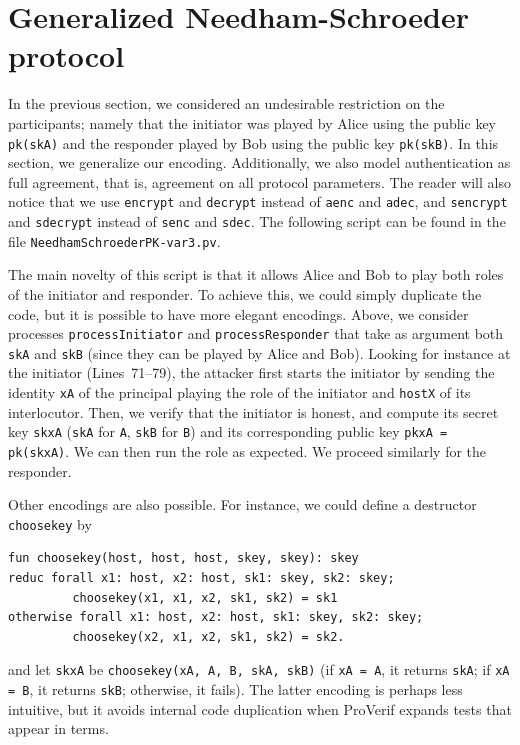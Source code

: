 \documentclass{book}
\begin{document}
\section{Generalized Needham-Schroeder protocol}\label{sec:caseStudyRevisited}

In the previous section, we considered an undesirable restriction on the participants; namely that the initiator was played by Alice using the public key \lstinline!pk(skA)! and the responder played by Bob using the public key \lstinline!pk(skB)!. In this section, we generalize our encoding. Additionally, we also model authentication as full agreement, that is, agreement on all protocol parameters. The reader will also notice that we use \lstinline!encrypt! and \lstinline!decrypt! instead of \lstinline!aenc! and \lstinline!adec!, and \lstinline!sencrypt! and \lstinline!sdecrypt! instead of \lstinline!senc! and \lstinline!sdec!. The following script can be found in the file \texttt{{\docexdir}NeedhamSchroederPK-var3.pv}.
%

%
The main novelty of this script is that it allows Alice and Bob to
play both roles of the initiator and responder. To achieve this, we
could simply duplicate the code, but it is possible to have more
elegant encodings.  Above, we consider processes
\lstinline!processInitiator! and \lstinline!processResponder! that
take as argument both \lstinline!skA!  and \lstinline!skB! (since they
can be played by Alice and Bob).  Looking for instance at the
initiator (Lines~71--79), the attacker first starts the initiator by
sending the identity \lstinline!xA!  of the principal playing the role
of the initiator and \lstinline!hostX! of its interlocutor. Then, we
verify that the initiator is honest, and compute its secret key
\lstinline!skxA! (\lstinline!skA!  for \lstinline!A!, \lstinline!skB!
for \lstinline!B!) and its corresponding public key
\lstinline!pkxA = pk(skxA)!. We can then run the role as expected.
We proceed similarly for the responder.

Other encodings are also possible. For instance, we could define
a destructor \lstinline!choosekey! by
\begin{lstlisting}[numbers=none]
fun choosekey(host, host, host, skey, skey): skey
reduc forall x1: host, x2: host, sk1: skey, sk2: skey;
         choosekey(x1, x1, x2, sk1, sk2) = sk1
otherwise forall x1: host, x2: host, sk1: skey, sk2: skey;
         choosekey(x2, x1, x2, sk1, sk2) = sk2.
\end{lstlisting}
and let \lstinline!skxA! be \lstinline!choosekey(xA, A, B, skA, skB)!
(if \lstinline!xA = A!, it returns \lstinline!skA!; if \lstinline!xA = B!,
it returns \lstinline!skB!; otherwise, it fails).
The latter encoding is perhaps less intuitive, but it avoids internal
code duplication when ProVerif expands tests that appear in terms.
\end{document}
